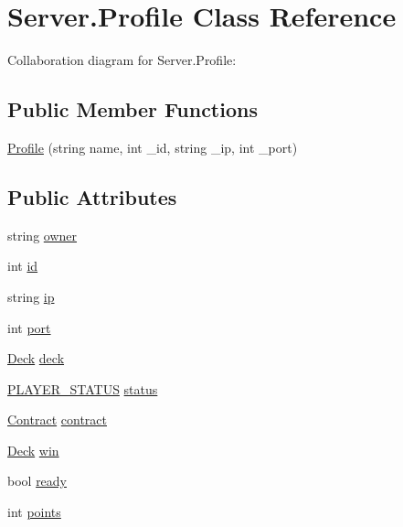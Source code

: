 \hypertarget{class_server_1_1_profile}{}\section{Server.\+Profile Class Reference}
\label{class_server_1_1_profile}


Collaboration diagram for Server.\+Profile\+:
\subsection*{Public Member Functions}
\begin{DoxyCompactItemize}
\item 
\hyperlink{class_server_1_1_profile_a1c8c2f5f1d1acf3e6303ff330cf7058d}{Profile} (string name, int \+\_\+id, string \+\_\+ip, int \+\_\+port)
\end{DoxyCompactItemize}
\subsection*{Public Attributes}
\begin{DoxyCompactItemize}
\item 
string \hyperlink{class_server_1_1_profile_a5164872783fd0c6966cb4adfd4bd8aa8}{owner}
\item 
int \hyperlink{class_server_1_1_profile_a7c33482aae15048d64f918ea55be1594}{id}
\item 
string \hyperlink{class_server_1_1_profile_a29c991a350d7230881419bf71a374ee3}{ip}
\item 
int \hyperlink{class_server_1_1_profile_a874fcf418204b40c14a66169e7651ef3}{port}
\item 
\hyperlink{class_game_1_1_deck}{Deck} \hyperlink{class_server_1_1_profile_a21c96a3449f0b52e4a3f06741f369788}{deck}
\item 
\hyperlink{_player_manager_8cs_ad4fb168881776778ff2e0f659212a0da}{P\+L\+A\+Y\+E\+R\+\_\+\+S\+T\+A\+T\+US} \hyperlink{class_server_1_1_profile_ab4e81f19ca7f09df48bbf54bf3cd37ed}{status}
\item 
\hyperlink{class_game_1_1_contract}{Contract} \hyperlink{class_server_1_1_profile_a10830f7350f39c402412482075b32bca}{contract}
\item 
\hyperlink{class_game_1_1_deck}{Deck} \hyperlink{class_server_1_1_profile_a6ea89928248a56c2d602e736aa00af00}{win}
\item 
bool \hyperlink{class_server_1_1_profile_a4c774c7861a97447f29e51cc58d79df2}{ready}
\item 
int \hyperlink{class_server_1_1_profile_a5cec9a20a8b2479e5a74cf802d53d21e}{points}
\end{DoxyCompactItemize}


